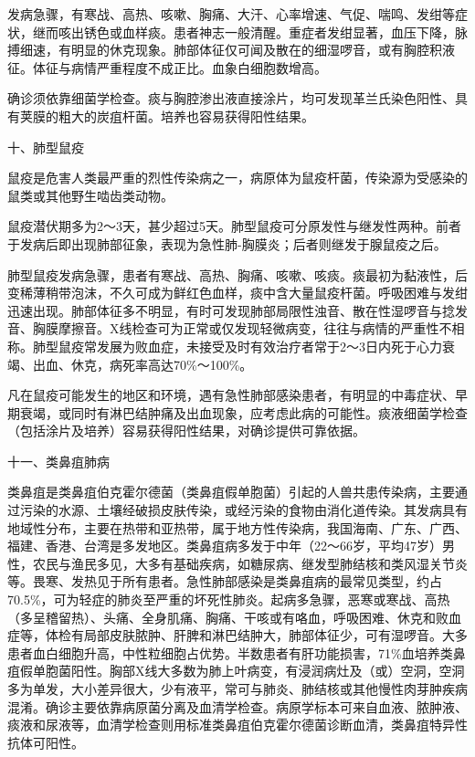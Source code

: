 发病急骤，有寒战、高热、咳嗽、胸痛、大汗、心率增速、气促、喘鸣、发绀等症状，继而咳出锈色或血样痰。患者神志一般清醒。重症者发绀显著，血压下降，脉搏细速，有明显的休克现象。肺部体征仅可闻及散在的细湿啰音，或有胸腔积液征。体征与病情严重程度不成正比。血象白细胞数增高。

确诊须依靠细菌学检查。痰与胸腔渗出液直接涂片，均可发现革兰氏染色阳性、具有荚膜的粗大的炭疽杆菌。培养也容易获得阳性结果。

\hypertarget{text00025.htmlux5cux23CHP2-7-1-2-10}{}
十、肺型鼠疫

鼠疫是危害人类最严重的烈性传染病之一，病原体为鼠疫杆菌，传染源为受感染的鼠类或其他野生啮齿类动物。

鼠疫潜伏期多为2～3天，甚少超过5天。肺型鼠疫可分原发性与继发性两种。前者于发病后即出现肺部征象，表现为急性肺-胸膜炎；后者则继发于腺鼠疫之后。

肺型鼠疫发病急骤，患者有寒战、高热、胸痛、咳嗽、咳痰。痰最初为黏液性，后变稀薄稍带泡沫，不久可成为鲜红色血样，痰中含大量鼠疫杆菌。呼吸困难与发绀迅速出现。肺部体征多不明显，有时可发现肺部局限性浊音、散在性湿啰音与捻发音、胸膜摩擦音。X线检查可为正常或仅发现轻微病变，往往与病情的严重性不相称。肺型鼠疫常发展为败血症，未接受及时有效治疗者常于2～3日内死于心力衰竭、出血、休克，病死率高达70\%～100\%。

凡在鼠疫可能发生的地区和环境，遇有急性肺部感染患者，有明显的中毒症状、早期衰竭，或同时有淋巴结肿痛及出血现象，应考虑此病的可能性。痰液细菌学检查（包括涂片及培养）容易获得阳性结果，对确诊提供可靠依据。

\hypertarget{text00025.htmlux5cux23CHP2-7-1-2-11}{}
十一、类鼻疽肺病

类鼻疽是类鼻疽伯克霍尔德菌（类鼻疽假单胞菌）引起的人兽共患传染病，主要通过污染的水源、土壤经破损皮肤传染，或经污染的食物由消化道传染。其发病具有地域性分布，主要在热带和亚热带，属于地方性传染病，我国海南、广东、广西、福建、香港、台湾是多发地区。类鼻疽病多发于中年（22～66岁，平均47岁）男性，农民与渔民多见，大多有基础疾病，如糖尿病、继发型肺结核和类风湿关节炎等。畏寒、发热见于所有患者。急性肺部感染是类鼻疽病的最常见类型，约占70.5\%，可为轻症的肺炎至严重的坏死性肺炎。起病多急骤，恶寒或寒战、高热（多呈稽留热）、头痛、全身肌痛、胸痛、干咳或有咯血，呼吸困难、休克和败血症等，体检有局部皮肤脓肿、肝脾和淋巴结肿大，肺部体征少，可有湿啰音。大多患者血白细胞升高，中性粒细胞占优势。半数患者有肝功能损害，71\%血培养类鼻疽假单胞菌阳性。胸部X线大多数为肺上叶病变，有浸润病灶及（或）空洞，空洞多为单发，大小差异很大，少有液平，常可与肺炎、肺结核或其他慢性肉芽肿疾病混淆。确诊主要依靠病原菌分离及血清学检查。病原学标本可来自血液、脓肿液、痰液和尿液等，血清学检查则用标准类鼻疽伯克霍尔德菌诊断血清，类鼻疽特异性抗体可阳性。

